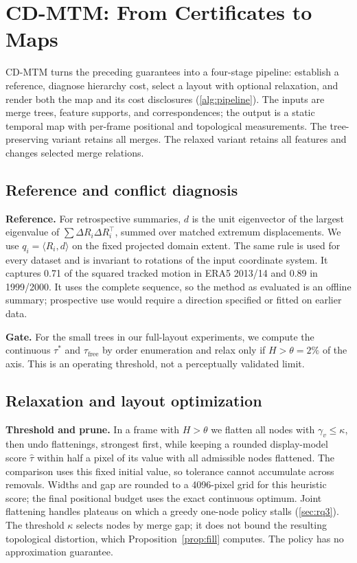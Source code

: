 \documentclass[review]{vgtc}                 %
\newcommand{\free}{\mathrm{free}}
\begin{document}
\section{CD-MTM: From Certificates to Maps}\label{sec:method}

CD-MTM turns the preceding guarantees into a four-stage pipeline: establish a reference, diagnose hierarchy cost, select a layout with optional relaxation, and render both the map and its cost disclosures (\cref{alg:pipeline}). The inputs are merge trees, feature supports, and correspondences; the output is a static temporal map with per-frame positional and topological measurements. The tree-preserving variant retains all merges. The relaxed variant retains all features and changes selected merge relations.

\subsection{Reference and conflict diagnosis}

\textbf{Reference.} For retrospective summaries, $d$ is the unit eigenvector of the largest eigenvalue of $\sum\Delta R_i\Delta R_i^\top$, summed over matched extremum displacements. We use $q_i=\langle R_i,d\rangle$ on the fixed projected domain extent. The same rule is used for every dataset and is invariant to rotations of the input coordinate system. It captures 0.71 of the squared tracked motion in ERA5 2013/14 and 0.89 in 1999/2000. It uses the complete sequence, so the method as evaluated is an offline summary; prospective use would require a direction specified or fitted on earlier data.

\textbf{Gate.} For the small trees in our full-layout experiments, we compute the continuous $\tau^*$ and $\tau_\free$ by order enumeration and relax only if $H>\theta=2\%$ of the axis. This is an operating threshold, not a perceptually validated limit.

\subsection{Relaxation and layout optimization}

\textbf{Threshold and prune.} In a frame with $H>\theta$ we flatten all nodes with $\gamma_v\le\kappa$, then undo flattenings, strongest first, while keeping a rounded display-model score $\widehat\tau$ within half a pixel of its value with all admissible nodes flattened. The comparison uses this fixed initial value, so tolerance cannot accumulate across removals. Widths and gap are rounded to a 4096-pixel grid for this heuristic score; the final positional budget uses the exact continuous optimum. Joint flattening handles plateaus on which a greedy one-node policy stalls (\cref{sec:rq3}). The threshold $\kappa$ selects nodes by merge gap; it does not bound the resulting topological distortion, which Proposition~\ref{prop:fill} computes. The policy has no approximation guarantee.
\end{document}
